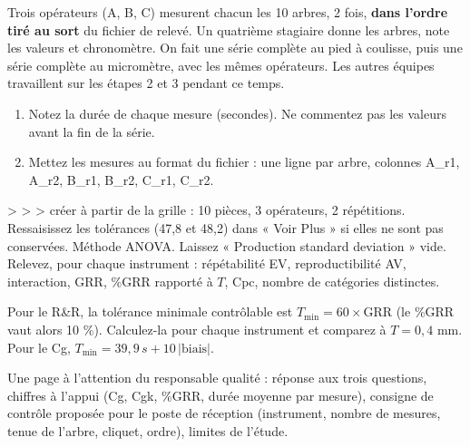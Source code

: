 \documentclass[10pt,a4paper]{article}
\begin{document}
Trois opérateurs (A, B, C) mesurent chacun les 10 arbres, 2 fois, \textbf{dans l'ordre tiré au sort} du fichier de relevé. Un quatrième stagiaire donne les arbres, note les valeurs et chronomètre. On fait une série complète au pied à coulisse, puis une série complète au micromètre, avec les mêmes opérateurs. Les autres équipes travaillent sur les étapes 2 et 3 pendant ce temps.
\begin{enumerate}[label=\textcolor{cyan}{\textbf{\arabic*.}},leftmargin=15pt,itemsep=1.5pt]
\item Notez la durée de chaque mesure (secondes). Ne commentez pas les valeurs avant la fin de la série.
\item Mettez les mesures au format du fichier  : une ligne par arbre, colonnes A\_r1, A\_r2, B\_r1, B\_r2, C\_r1, C\_r2.
\end{enumerate}

 \tagE
{} >  >  > créer à partir de la grille : 10 pièces, 3 opérateurs, 2 répétitions. Ressaisissez les tolérances (47,8 et 48,2) dans « Voir Plus » si elles ne sont pas conservées. Méthode ANOVA. Laissez « Production standard deviation » vide. Relevez, pour chaque instrument : répétabilité EV, reproductibilité AV, interaction, GRR, \%GRR rapporté à $T$, Cpc, nombre de catégories distinctes.

Pour le R\&R, la tolérance minimale contrôlable est $T_{\min} = 60 \times \text{GRR}$ (le \%GRR vaut alors 10 \%). Calculez-la pour chaque instrument et comparez à $T = 0{,}4$ mm. Pour le Cg, $T_{\min} = 39{,}9\,s + 10\,|\text{biais}|$.

Une page à l'attention du responsable qualité : réponse aux trois questions, chiffres à l'appui (Cg, Cgk, \%GRR, durée moyenne par mesure), consigne de contrôle proposée pour le poste de réception (instrument, nombre de mesures, tenue de l'arbre, cliquet, ordre), limites de l'étude.
\end{document}
